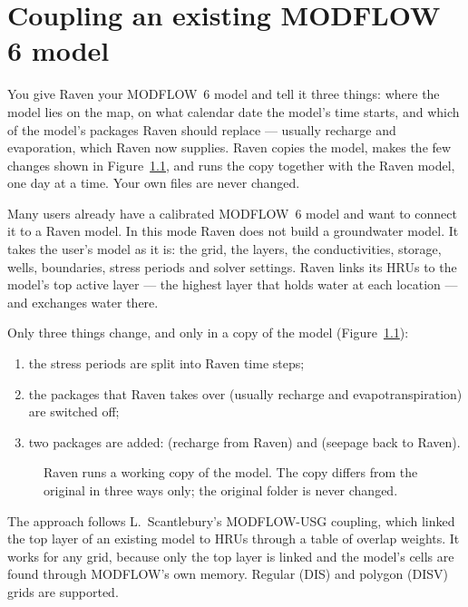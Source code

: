 \chapter{Coupling an existing MODFLOW 6 model}\label{ch:existing}

\begin{plain}
You give Raven your MODFLOW~6 model and tell it three things: where the model lies on the map, on what calendar date the
model's time starts, and which of the model's packages Raven should replace --- usually recharge and evaporation, which Raven
now supplies. Raven copies the model, makes the few changes shown in Figure~\ref{fig:workcopy}, and runs the copy together
with the Raven model, one day at a time. Your own files are never changed.
\end{plain}

Many users already have a calibrated MODFLOW~6 model and want to connect it to a Raven model. In this mode Raven does not
build a groundwater model. It takes the user's model as it is: the grid, the layers, the conductivities, storage, wells,
boundaries, stress periods and solver settings. Raven links its HRUs to the model's top active layer --- the highest layer
that holds water at each location --- and exchanges water there.

Only three things change, and only in a copy of the model (Figure~\ref{fig:workcopy}):
\begin{enumerate}
\item the stress periods are split into Raven time steps;
\item the packages that Raven takes over (usually recharge and evapotranspiration) are switched off;
\item two packages are added:  (recharge from Raven) and  (seepage back to Raven).
\end{enumerate}

\begin{figure}[!htbp]\centering
\caption{Raven runs a working copy of the model. The copy differs from the original in three ways only; the original folder is never changed.}\label{fig:workcopy}
\end{figure}

The approach follows L.~Scantlebury's MODFLOW-USG coupling, which linked the top layer of an existing model to HRUs
through a table of overlap weights. It works for any grid, because only the top layer is linked and the model's cells are
found through MODFLOW's own memory. Regular (DIS) and polygon (DISV) grids are supported.

